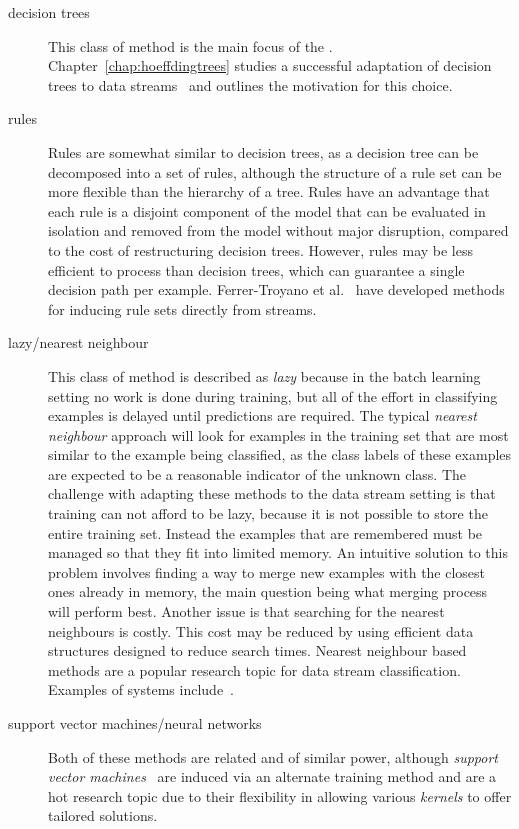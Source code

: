 \begin{description}
\item[decision trees] This class of method is the main focus of the \thesis. Chapter~\ref{chap:hoeffdingtrees} studies a successful adaptation of decision trees to data streams~\cite{vfdt} and outlines the motivation for this choice.
\item[rules] Rules are somewhat similar to decision trees, as a decision tree can be decomposed into a set of rules, although the structure of a rule set can be more flexible than the hierarchy of a tree. Rules have an advantage that each rule is a disjoint component of the model that can be evaluated in isolation and removed from the model without major disruption, compared to the cost of restructuring decision trees. However, rules may be less efficient to process than decision trees, which can guarantee a single decision path per example. Ferrer-Troyano et al.~\cite{scallop, dsrules} have developed methods for inducing rule sets directly from streams.
\item[lazy/nearest neighbour] This class of method is described as {\em lazy} because in the batch learning setting no work is done during training, but all of the effort in classifying examples is delayed until predictions are required. The typical {\em nearest neighbour} approach will look for examples in the training set that are most similar to the example being classified, as the class labels of these examples are expected to be a reasonable indicator of the unknown class. The challenge with adapting these methods to the data stream setting is that training can not afford to be lazy, because it is not possible to store the entire training set. Instead the examples that are remembered must be managed so that they fit into limited memory. An intuitive solution to this problem involves finding a way to merge new examples with the closest ones already in memory, the main question being what merging process will perform best. Another issue is that searching for the nearest neighbours is costly. This cost may be reduced by using efficient data structures designed to reduce search times. Nearest neighbour based methods are a popular research topic for data stream classification. Examples of systems include~\cite{anncad, lwclass, ds-knn, ds-instancebased}.
\item[support vector machines/neural networks] Both of these methods are related and of similar power, although {\em support vector machines}~\cite{svm} are induced via an alternate training method and are a hot research topic due to their flexibility in allowing various {\em kernels} to offer tailored solutions.

\end{description}
